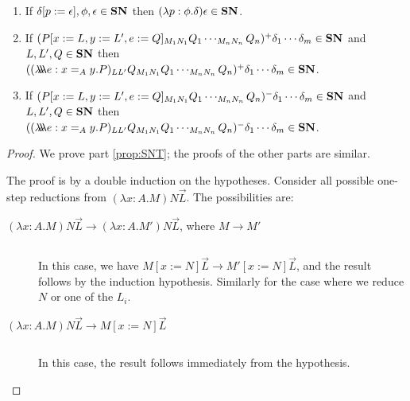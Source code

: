 \begin{prop}
\begin{enumerate}
\item
\label{prop:SNP}
If $\delta[p:=\epsilon], \phi, \epsilon \in \mathbf{SN}$ then $(\lambda p:\phi.\delta)\epsilon \in \mathbf{SN}$.
\item
\label{prop:SNE}
If $(P[x:=L, y:=L', e:=Q]_{M_1 N_1} Q_1 \cdots_{M_n N_n} Q_n)^+ \delta_1 \cdots \delta_m \in \mathbf{SN}$ and $L, L', Q \in \mathbf{SN}$ then $((\lambda \!\! \lambda \!\! \lambda e:x =_A y.P)_{L L'} Q_{M_1 N_1} Q_1 \cdots_{M_n N_n} Q_n)^+ \delta_1 \cdots \delta_m \in \mathbf{SN}$.
\item
If $(P[x:=L, y:=L', e:=Q]_{M_1 N_1} Q_1 \cdots_{M_n N_n} Q_n)^- \delta_1 \cdots \delta_m \in \mathbf{SN}$ and $L, L', Q \in \mathbf{SN}$ then $((\lambda \!\! \lambda \!\! \lambda e:x =_A y.P)_{L L'} Q_{M_1 N_1} Q_1 \cdots_{M_n N_n} Q_n)^- \delta_1 \cdots \delta_m \in \mathbf{SN}$.
\end{enumerate}
\end{prop}

\begin{proof}
We prove part \ref{prop:SNT}; the proofs of the other parts are similar.

The proof is by a double induction on the hypotheses.  Consider all possible one-step reductions from $(\lambda x:A.M) N \vec{L}$.  The possibilities are:
\begin{description}
\item[$(\lambda x:A.M) N \vec{L} \rightarrow (\lambda x:A.M')N \vec{L}$, where $M \rightarrow M'$]
$ $

In this case, we have $M[x:=N] \vec{L} \rightarrow M'[x:=N] \vec{L}$, and the result follows by the induction hypothesis.  Similarly for the case
where we reduce $N$ or one of the $L_i$.
\item[$(\lambda x:A.M)N \vec{L} \rightarrow M{[x:=N]} \vec{L}$]
$ $

In this case, the result follows immediately from the hypothesis.
\end{description}
\end{proof}

